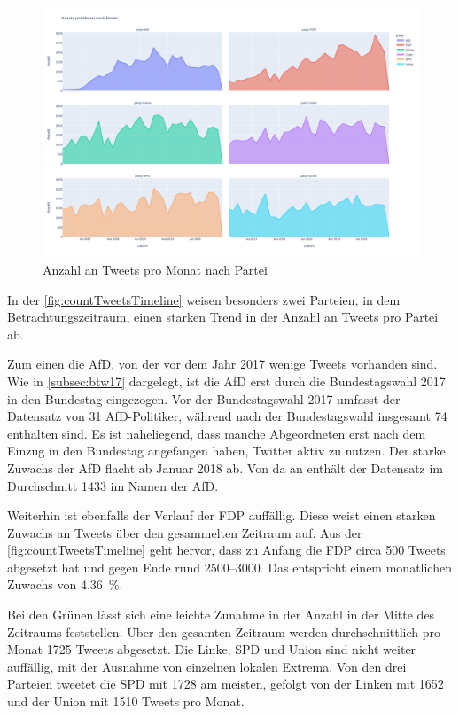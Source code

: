 \begin{figure}[H]
    \centering
    \includegraphics[width=\textwidth]{data/images/tweets/anzahl_pro_monat_nach_partei.png}
    \caption{Anzahl an Tweets pro Monat nach Partei} \label{fig:countTweetsTimeline}
\end{figure}

In der \autoref{fig:countTweetsTimeline} weisen besonders zwei Parteien, in dem Betrachtungszeitraum, einen starken Trend in der Anzahl an Tweets pro Partei ab.

Zum einen die \ac{AfD}, von der vor dem Jahr \num{2017} wenige Tweets vorhanden sind. Wie in \autoref{subsec:btw17} dargelegt, ist die \ac{AfD} erst durch die Bundestagswahl \num{2017} in den Bundestag eingezogen. Vor der Bundestagswahl \num{2017} umfasst der Datensatz von \textcite{saltzer_bundestagswahl_2022} \num{31} \ac{AfD}-Politiker, während nach der Bundestagswahl insgesamt \num{74} enthalten sind. Es ist naheliegend, dass manche Abgeordneten erst nach dem Einzug in den Bundestag angefangen haben, Twitter aktiv zu nutzen. Der starke Zuwachs der \ac{AfD} flacht ab Januar \num{2018} ab. Von da an enthält der Datensatz im Durchschnitt \num{1433} im Namen der \ac{AfD}.

Weiterhin ist ebenfalls der Verlauf der \ac{FDP} auffällig. Diese weist einen starken Zuwachs an Tweets über den gesammelten Zeitraum auf. Aus der \autoref{fig:countTweetsTimeline} geht hervor, dass zu Anfang die \ac{FDP} circa \num{500} Tweets abgesetzt hat und gegen Ende rund \numrange{2500}{3000}. Das entspricht einem monatlichen Zuwachs von \SI{4.36}{\percent}.

Bei den Grünen lässt sich eine leichte Zunahme in der Anzahl in der Mitte des Zeitraums feststellen. Über den gesamten Zeitraum werden durchschnittlich pro Monat \num{1725} Tweets abgesetzt. Die Linke, \ac{SPD} und Union sind nicht weiter auffällig, mit der Ausnahme von einzelnen lokalen Extrema. Von den drei Parteien tweetet die \ac{SPD} mit \num{1728} am meisten, gefolgt von der Linken mit \num{1652} und der Union mit \num{1510} Tweets pro Monat.

